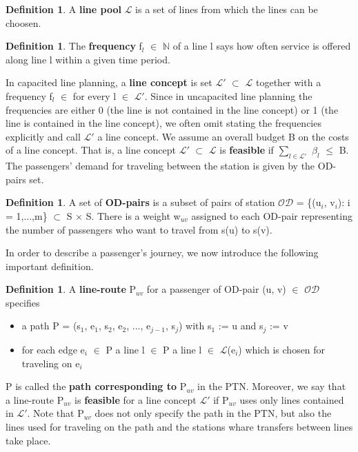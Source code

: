 \documentclass[
  twoside,
  12pt, a4paper,
  footinclude=true,
  headinclude=true,
  cleardoublepage=empty
]{scrbook}
\theoremstyle{definition}
\newtheorem{definition}[theorem]{Definition}
\begin{document}
\begin{definition}
A \textbf{line pool} $\mathcal{L}$ is a set of lines from which the lines can be choosen.
\end{definition}
\begin{definition}
The \textbf{frequency} f$_l$ $\in$ $\mathbb{N}$ of a line l says how often service is offered along line l within a given time period. 
\end{definition}
In capacited line planning, a \textbf{line concept} is  set $\mathcal{L'}$ $\subset$ $\mathcal{L}$ together with a frequency f$_l$  $\in$ for every l $\in$ $\mathcal{L'}$. Since in uncapacited line planning the frequencies are either 0 (the line is not contained in the line concept) or 1 (the line is contained in the line concept), we often omit stating the frequencies explicitly and call $\mathcal{L'}$ a line concept. \newline
We assume an overall budget B on the costs of a line concept. That is, a line concept $\mathcal{L'}$ $\subset$ $\mathcal{L}$ is \textbf{feasible} if $\sum_{l\in\mathcal{L'}}$ $\beta_l$ $\le$ B. 
The passengers' demand for traveling between the station is given by the OD-pairs set.
\begin{definition}
A set of \textbf{OD-pairs} is a subset of pairs of station $\mathcal{OD}$ = \{(u$_i$, v$_i$): i = 1,...,m\} $\subset$ S $\times$ S. There is a weight w$_{uv}$ assigned to each OD-pair representing the number of passengers who want to travel from s(u) to s(v).
\end{definition}
In order to describe a passenger's journey, we now introduce the following important definition.
\begin{definition}
A \textbf{line-route} P$_{uv}$ for a passenger of OD-pair (u, v) $\in$ $\mathcal{OD}$ specifies
\begin{itemize}
\item a path P = (s$_1$, e$_1$, s$_2$, e$_2$, ..., e$_{j-1}$, s$_j$) with s$_1$ := u and s$_j$ := v
\item for each edge e$_i$ $\in$ P a line l $\in$ P a line l $\in$ $\mathcal{L}$(e$_i$) which is chosen for traveling on e$_i$
\end{itemize}
P is called the \textbf{path corresponding to} P$_{uv}$ in the PTN. Moreover, we say that a line-route P$_{uv}$ is \textbf{feasible} for a line concept $\mathcal{L'}$ if P$_{uv}$  uses only lines contained in $\mathcal{L'}$. Note that P$_{uv}$ does not only specify the path in the PTN, but also the lines used for traveling on the path and the stations whare transfers between lines take place.
\end{definition}
\end{document}
